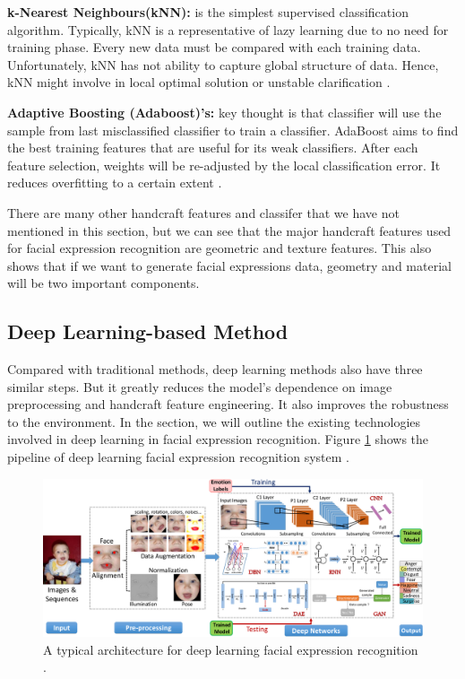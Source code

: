 \textbf{k-Nearest Neighbours(kNN):} is the simplest supervised classification algorithm. Typically, kNN is a representative of lazy learning due to no need for training phase. Every new data must be compared with each training data. Unfortunately, kNN has not ability to capture global structure of data. Hence, kNN might involve in local optimal solution or unstable clarification \citep*{dinoFacialExpressionClassification2019,wangNewFacialExpression2015}.

\textbf{Adaptive Boosting (Adaboost)'s:} key thought is that classifier will use the sample from last misclassified classifier  to train a classifier. AdaBoost aims to find the best training features that are useful for its weak classifiers. After each feature selection, weights will be re-adjusted by the local classification error. It reduces overfitting to a certain extent \citep*{liewFacialExpressionRecognition2015,krishnagudipatiEfficientFacialExpression2016}.

There are many other handcraft features and classifer that we have not mentioned in this section, but we can see that the major handcraft features used for facial expression recognition are geometric and texture features. This also shows that if we want to generate facial expressions data, geometry and material  will be two important components.

\subsection{Deep Learning-based Method}
Compared with traditional methods, deep learning methods also have three similar steps. But it greatly reduces the model's dependence on image preprocessing and handcraft feature engineering. It also improves the robustness to the environment. In the section, we will outline the existing technologies involved in deep learning in facial expression recognition. Figure \ref{fig:deep} shows the pipeline of deep learning facial expression recognition system .
\begin{figure}[H]
    \centering
    \includegraphics[width=\textwidth]{./figs/deep.png}
    \caption{A typical architecture for deep learning facial expression recognition \citep{liDeepFacialExpression2020}.}
    \label{fig:deep}
\end{figure}

